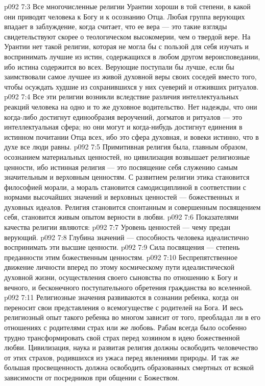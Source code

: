\vs p092 7:3 Все многочисленные религии Урантии хороши в той степени, в какой они приводят человека к Богу и к осознанию Отца. Любая группа верующих впадает в заблуждение, когда считает, что ее вера --- это  такие взгляды свидетельствуют скорее о теологическом высокомерии, чем о твердой вере. На Урантии нет такой религии, которая не могла бы с пользой для себя изучать и воспринимать лучшие из истин, содержащихся в любом другом вероисповедании, ибо истина содержится во всех. Верующие поступали бы лучше, если бы заимствовали самое лучшее из живой духовной веры своих соседей вместо того, чтобы осуждать худшие из сохранившихся у них суеверий и отживших ритуалов.
\vs p092 7:4 Все эти религии возникли вследствие различия интеллектуальных реакций человека на одно и то же духовное водительство. Нет надежды, что они когда\hyp{}либо достигнут единообразия вероучений, догматов и ритуалов --- это интеллектуальная сфера; но они могут и когда\hyp{}нибудь достигнут единения в истинном почитании Отца всех, ибо это сфера духовная, и вовеки истинно, что в духе все люди равны.
\vs p092 7:5 \pc Примитивная религия была, главным образом, осознанием материальных ценностей, но цивилизация возвышает религиозные ценности, ибо истинная религия --- это посвящение себя служению самым значительным и верховным ценностям. С развитием религии этика становится философией морали, а мораль становится самодисциплиной в соответствии с нормами высочайших значений и верховных ценностей --- божественных и духовных идеалов. Религия становится спонтанным и совершенным посвящением себя, становится живым опытом верности в любви.
\vs p092 7:6 Показателями качества религии являются:
\vs p092 7:7 \bibnobreakspace Уровень ценностей --- чему предан верующий.
\vs p092 7:8 \bibnobreakspace Глубина значений --- способность человека идеалистично воспринимать эти высшие ценности.
\vs p092 7:9 \bibnobreakspace Сила посвящения --- степень преданности этим божественным ценностям.
\vs p092 7:10 \bibnobreakspace Беспрепятственное движение личности вперед по этому космическому пути идеалистической духовной жизни, осуществления своего сыновства по отношению к Богу и вечного, и бесконечного поступательного обретения гражданства во вселенной.
\vs p092 7:11 \pc Религиозные значения развиваются в сознании ребенка, когда он переносит свои представления о всемогуществе с родителей на Бога. И весь религиозный опыт такого ребенка во многом зависит от того, преобладал ли в его отношениях с родителями страх или же любовь. Рабам всегда было особенно трудно трансформировать свой страх перед хозяином в идею божественной любви. Цивилизация, наука и развитая религия должны освободить человечество от этих страхов, родившихся из ужаса перед явлениями природы. И так же большая просвещенность должна освободить образованных смертных от всякой зависимости от посредников при общении с Божеством.
